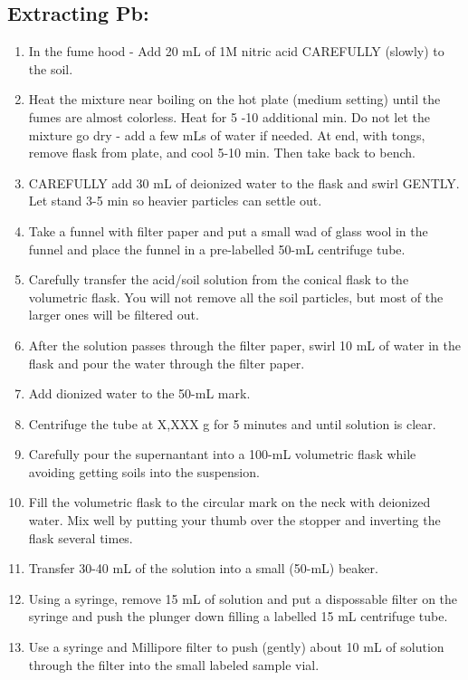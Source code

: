 \documentclass[12pt]{../SOP3_alpha}
\begin{document}
\subsection {Extracting Pb:}
  \begin{enumerate}
    \item In the fume hood - Add 20 mL of 1M nitric acid CAREFULLY (slowly) to the soil.
    \item Heat the mixture near boiling on the hot plate (medium setting) until the fumes are almost colorless. Heat for 5 -10 additional min. Do not let the mixture go dry - add a few mLs of water if needed. At end, with tongs, remove flask from plate, and cool 5-10 min. Then take back to bench.
    \item CAREFULLY add 30 mL of deionized water to the flask and swirl GENTLY. Let stand 3-5 min so heavier particles can  settle out.
    \item Take a funnel with filter paper and put a small wad of glass wool in the funnel and place the funnel in a pre-labelled 50-mL centrifuge tube. 
    \item Carefully transfer the acid/soil solution from the conical flask to the volumetric flask. You will not remove all the soil particles, but most of the larger ones will be filtered out.
    \item After the solution passes through the filter paper, swirl 10 mL of water in the flask and pour the water through the filter paper. 

    \item Add dionized water to the 50-mL mark.

    \item Centrifuge the tube at X,XXX g for 5 minutes and until solution is clear. 

    \item Carefully pour the supernantant into a 100-mL volumetric flask while avoiding getting soils into the suspension. 

    \item Fill the volumetric flask to the circular mark on the neck with deionized water. Mix well by putting your thumb over the stopper and inverting the flask several times. 

    \item Transfer 30-40 mL of the solution into a small (50-mL) beaker.

    \item Using a syringe, remove 15 mL of solution and put a dispossable filter on the syringe and push the plunger down filling a labelled 15 mL centrifuge tube. 

    \item Use a syringe and Millipore filter to push (gently) about 10 mL of solution through the filter into the small labeled sample vial.
   \end{enumerate}
   
\end{document}
